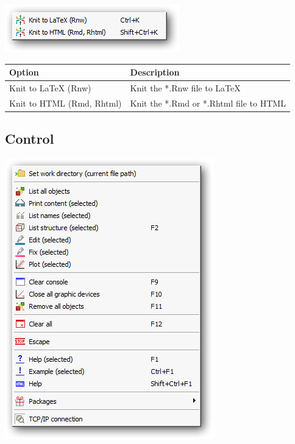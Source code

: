 \includegraphics[scale=0.50]{./res/menu_r_send_knitr.png}\\

\begin{scriptsize}\begin{tabularx}{\textwidth}{>{\hsize=0.3\hsize}X>{\hsize=0.7\hsize}X}\\
    \hline
    \textbf{Option} & \textbf{Description} \\
    \hline
    Knit to LaTeX (Rnw) & Knit the *.Rnw file to \LaTeX \\
    Knit to HTML (Rmd, Rhtml) & Knit the *.Rmd or *.Rhtml file to HTML\\
    \hline
  \end{tabularx}\end{scriptsize}


\hypertarget{menu_r_control}{}
\subsection{Control}

\includegraphics[scale=0.50]{./res/menu_r_control.png}\\

